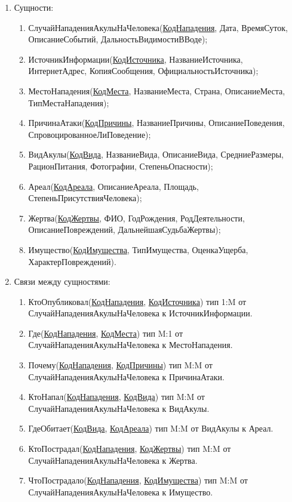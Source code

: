\documentclass[russian,utf8,simple,emptystyle]{eskdtext}
\begin{document}
\begin{enumerate}
	\item Сущности:
	\begin{enumerate}
		\item СлучайНападенияАкулыНаЧеловека(\underline{КодНападения}, Дата, ВремяСуток, ОписаниеСобытий, ДальностьВидимостиВВоде);
		\item ИсточникИнформации(\underline{КодИсточника}, НазваниеИсточника, ИнтернетАдрес, КопияСообщения, ОфициальностьИсточника);
		\item МестоНападения(\underline{КодМеста}, НазваниеМеста, Страна, ОписаниеМеста, ТипМестаНападения);
		\item ПричинаАтаки(\underline{КодПричины}, НазваниеПричины, ОписаниеПоведения, СпровоцированноеЛиПоведение);
		\item ВидАкулы(\underline{КодВида}, НазваниеВида, ОписаниеВида, СредниеРазмеры, РационПитания, Фотографии, СтепеньОпасности);
		\item Ареал(\underline{КодАреала}, ОписаниеАреала, Площадь, СтепеньПрисутствияЧеловека);
		\item Жертва(\underline{КодЖертвы}, ФИО, ГодРождения, РодДеятельности, ОписаниеПовреждений, ДальнейшаяСудьбаЖертвы);
		\item Имущество(\underline{КодИмущества}, ТипИмущества, ОценкаУщерба,  ХарактерПовреждений).
	\end{enumerate}
	
	\item Связи между сущностями:
	\begin{enumerate}
		\item КтоОпубликовал(\underline{КодНападения}, \underline{КодИсточника}) тип 1:M от СлучайНападенияАкулыНаЧеловека к ИсточникИнформации.
		\item Где(\underline{КодНападения}, \underline{КодМеста}) тип M:1 от СлучайНападенияАкулыНаЧеловека к МестоНападения.
		\item Почему(\underline{КодНападения}, \underline{КодПричины}) тип M:M от СлучайНападенияАкулыНаЧеловека к ПричинаАтаки.
		\item КтоНапал(\underline{КодНападения}, \underline{КодВида}) тип M:M от СлучайНападенияАкулыНаЧеловека к ВидАкулы.
		\item ГдеОбитает(\underline{КодВида}, \underline{КодАреала}) тип M:M от ВидАкулы к Ареал.
		\item КтоПострадал(\underline{КодНападения}, \underline{КодЖертвы}) тип M:M от СлучайНападенияАкулыНаЧеловека к Жертва.
		\item ЧтоПострадало(\underline{КодНападения}, \underline{КодИмущества}) тип M:M от СлучайНападенияАкулыНаЧеловека к Имущество.  
	\end{enumerate}
	

\end{enumerate}
\end{document}
